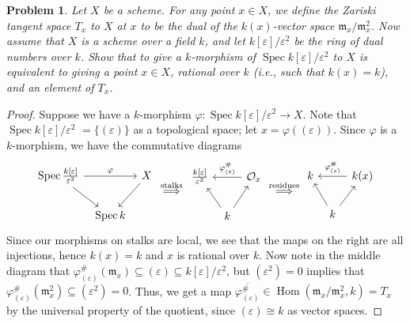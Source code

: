 \documentclass[12pt,letterpaper]{article}
\newtheorem{problem}{Problem}[section]
\theoremstyle{definition}
\theoremstyle{remark}
\numberwithin{equation}{section}
\numberwithin{figure}{problem}
\DeclareMathOperator{\Spec}{Spec}
\DeclareMathOperator{\Hom}{Hom}
\newcommand{\OO}{\mathcal{O}}
\begin{document}
\begin{problem}
  Let $X$ be a scheme. For any point $x \in X$, we define the \emph{Zariski tangent space} $T_x$ to $X$ at $x$ to be the dual of the $k(x)$-vector space $\mathfrak{m}_x/\mathfrak{m}_x^2$. Now assume that $X$ is a scheme over a field $k$, and let $k[\varepsilon]/\varepsilon^2$ be the \emph{ring of dual numbers} over $k$. Show that to give a $k$-morphism of $\Spec k[\varepsilon]/\varepsilon^2$ to $X$ is equivalent to giving a point $x \in X$, \emph{rational over $k$} (i.e., such that $k(x) = k$), and an element of $T_x$.
\end{problem}
\begin{proof}
  Suppose we have a $k$-morphism $\varphi\colon\Spec k[\varepsilon]/\varepsilon^2 \to X$. Note that $\Spec k[\varepsilon]/\varepsilon^2$ $= \{(\varepsilon)\}$ as a topological space; let $x = \varphi((\varepsilon))$. Since $\varphi$ is a $k$-morphism, we have the commutative diagrams
  \begin{equation*}
    \begin{tikzcd}[column sep=tiny]
      \Spec \frac{k[\varepsilon]}{\varepsilon^2} \arrow{rr}{\varphi}\arrow{dr} & & X\arrow{dl}\\
      & \Spec k
    \end{tikzcd} \overset{\text{stalks}}{\implies} 
    \begin{tikzcd}[column sep=tiny]
      \frac{k[\varepsilon]}{\varepsilon^2} \arrow[leftarrow]{rr}{\varphi^\#_{(\varepsilon)}}\arrow[leftarrow]{dr} & & \OO_x\arrow[leftarrow]{dl}\\
      & k
    \end{tikzcd} \overset{\text{residues}}{\implies} \begin{tikzcd}[column sep=tiny]
      k \arrow[leftarrow]{rr}{\varphi^\#_{(\varepsilon)}}\arrow[leftarrow]{dr} & & k(x)\arrow[leftarrow]{dl}\\
      & k
    \end{tikzcd}
  \end{equation*}
  Since our morphisms on stalks are local, we see that the maps on the right are all injections, hence $k(x) = k$ and $x$ is rational over $k$. Now note in the middle diagram that $\varphi^\#_{(\varepsilon)}(\mathfrak{m}_x) \subseteq (\varepsilon) \subseteq k[\varepsilon]/\varepsilon^2$, but $(\varepsilon^2) = 0$ implies that $\varphi^\#_{(\varepsilon)}(\mathfrak{m}_x^2) \subseteq (\varepsilon^2) = 0$. Thus, we get a map $\overline{\varphi^\#_{(\varepsilon)}} \in \Hom(\mathfrak{m}_x/\mathfrak{m}_x^2,k) = T_x$ by the universal property of the quotient, since $(\varepsilon) \cong k$ as vector spaces.

\end{proof}
\end{document}
